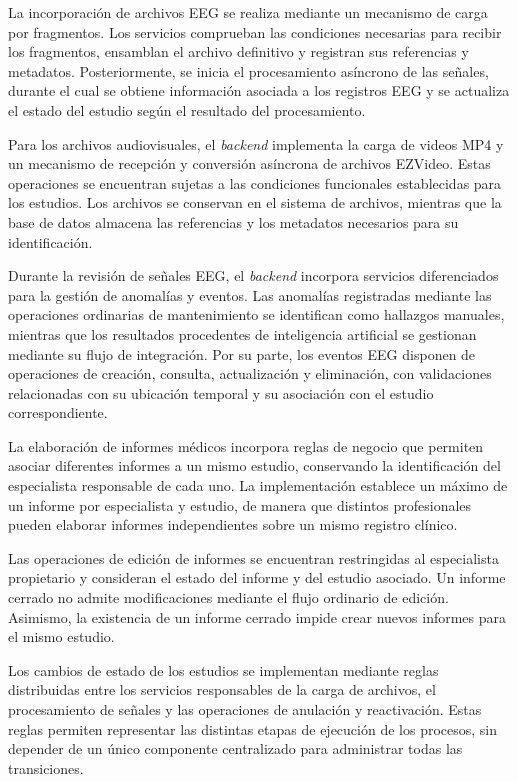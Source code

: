 La incorporación de archivos EEG se realiza
mediante un mecanismo de carga por fragmentos.
Los servicios comprueban las condiciones
necesarias para recibir los fragmentos,
ensamblan el archivo definitivo y registran
sus referencias y metadatos. Posteriormente,
se inicia el procesamiento asíncrono de
las señales, durante el cual se obtiene
información asociada a los registros EEG
y se actualiza el estado del estudio
según el resultado del procesamiento.

Para los archivos audiovisuales, el \textit{backend}
implementa la carga de videos MP4 y un
mecanismo de recepción y conversión asíncrona
de archivos EZVideo. Estas operaciones
se encuentran sujetas a las condiciones
funcionales establecidas para los estudios.
Los archivos se conservan en el sistema
de archivos, mientras que la base de datos
almacena las referencias y los metadatos
necesarios para su identificación.

Durante la revisión de señales EEG, el
\textit{backend} incorpora servicios diferenciados
para la gestión de anomalías y eventos.
Las anomalías registradas mediante las
operaciones ordinarias de mantenimiento
se identifican como hallazgos manuales,
mientras que los resultados procedentes
de inteligencia artificial se gestionan
mediante su flujo de integración.
Por su parte, los eventos EEG disponen
de operaciones de creación, consulta,
actualización y eliminación, con
validaciones relacionadas con su
ubicación temporal y su asociación
con el estudio correspondiente.

La elaboración de informes médicos incorpora
reglas de negocio que permiten asociar
diferentes informes a un mismo estudio,
conservando la identificación del especialista
responsable de cada uno. La implementación
establece un máximo de un informe por
especialista y estudio, de manera que
distintos profesionales pueden elaborar
informes independientes sobre un mismo
registro clínico.

Las operaciones de edición de informes
se encuentran restringidas al especialista
propietario y consideran el estado del
informe y del estudio asociado. Un informe
cerrado no admite modificaciones mediante
el flujo ordinario de edición. Asimismo,
la existencia de un informe cerrado
impide crear nuevos informes para
el mismo estudio.

Los cambios de estado de los estudios
se implementan mediante reglas distribuidas
entre los servicios responsables de
la carga de archivos, el procesamiento
de señales y las operaciones de anulación
y reactivación. Estas reglas permiten
representar las distintas etapas de
ejecución de los procesos, sin depender
de un único componente centralizado
para administrar todas las transiciones.

